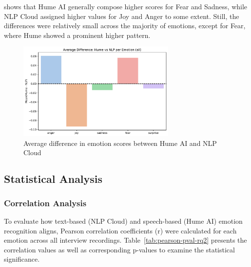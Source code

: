 shows that Hume AI generally compose higher scores for Fear and Sadness, while NLP Cloud assigned higher values for 
Joy and Anger to some extent. Still, the differences were relatively small across the majority of emotions, 
except for Fear, where Hume showed a prominent higher pattern. 

\begin{figure}[!h]
    \centering
    \includegraphics[width=0.7\textwidth]{png/results/rq2/hume_nlp_difference_all.pdf}
    \caption{Average difference in emotion scores between Hume AI and NLP Cloud}
    \label{fig:comp_bar_full_rq2}
\end{figure}

\newpage
\subsection{Statistical Analysis}
\subsubsection{Correlation Analysis}

To evaluate how text-based (NLP Cloud) and speech-based (Hume AI) emotion recognition aligns, Pearson correlation coefficients (r) were calculated for each emotion across all interview recordings. 
Table~\ref{tab:pearson-pval-rq2} presents the correlation values as well as corresponding p-values to examine the statistical significance. 

